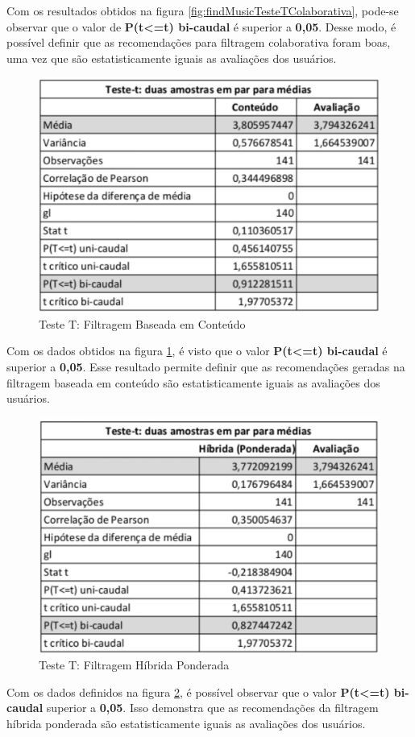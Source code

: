 Com os resultados obtidos na figura \ref{fig:findMusicTesteTColaborativa}, pode-se observar que o valor de \textbf{P(t<=t) bi-caudal} é superior a \textbf{0,05}. Desse modo, é possível definir que as recomendações para filtragem colaborativa foram boas, uma vez que são estatisticamente iguais as avaliações dos usuários.

\begin{figure}[H]
	\centering
	\includegraphics[width=.6\linewidth]{imagens/findmusicTesteTConteudo.jpg}
	\caption[Teste T: Filtragem Baseada em Conteúdo]{Teste T: Filtragem Baseada em Conteúdo}
    \label{fig:findMusicTesteTConteudo}
\end{figure}

Com os dados obtidos na figura \ref{fig:findMusicTesteTConteudo}, é visto que o valor \textbf{P(t<=t) bi-caudal} é superior a \textbf{0,05}. Esse resultado permite definir que as recomendações geradas na filtragem baseada em conteúdo são estatisticamente iguais as avaliações dos usuários.

\begin{figure}[H]
	\centering
	\includegraphics[width=.6\linewidth]{imagens/findmusicTesteTPonderado.jpg}
	\caption[Teste T: Filtragem Híbrida Ponderada]{Teste T: Filtragem Híbrida Ponderada}
    \label{fig:findMusicTesteTPonderado}
\end{figure}

Com os dados definidos na figura \ref{fig:findMusicTesteTPonderado}, é possível observar que o valor \textbf{P(t<=t) bi-caudal} superior a \textbf{0,05}. Isso demonstra que as recomendações da filtragem híbrida ponderada são estatisticamente iguais as avaliações dos usuários.

